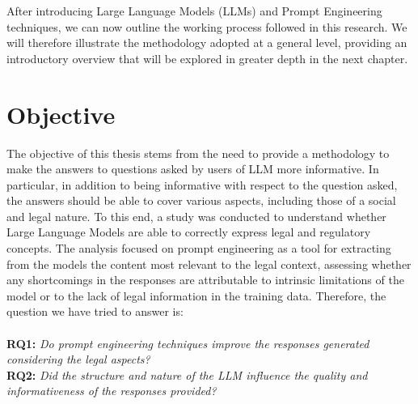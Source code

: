 
After introducing Large Language Models (LLMs) and Prompt Engineering techniques, we can now outline the working process followed in this research. We will therefore illustrate the methodology adopted at a general level, providing an introductory overview that will be explored in greater depth in the next chapter.
\section{Objective}
The objective of this thesis stems from the need to provide a methodology to make the answers to questions asked by users of LLM more informative. In particular, in addition to being informative with respect to the question asked, the answers should be able to cover various aspects, including those of a social and legal nature.
To this end, a study was conducted to understand whether Large Language Models are able to correctly express legal and regulatory concepts. The analysis focused on prompt engineering as a tool for extracting from the models the content most relevant to the legal context, assessing whether any shortcomings in the responses are attributable to intrinsic limitations of the model or to the lack of legal information in the training data.
Therefore, the question we have tried to answer is:\\
\\
\textbf{RQ1: }\textit{Do prompt engineering techniques improve the responses generated considering the legal aspects?}\\
\textbf{RQ2: }\textit{Did the structure and nature of the LLM influence the quality and informativeness of the responses provided?}\\
